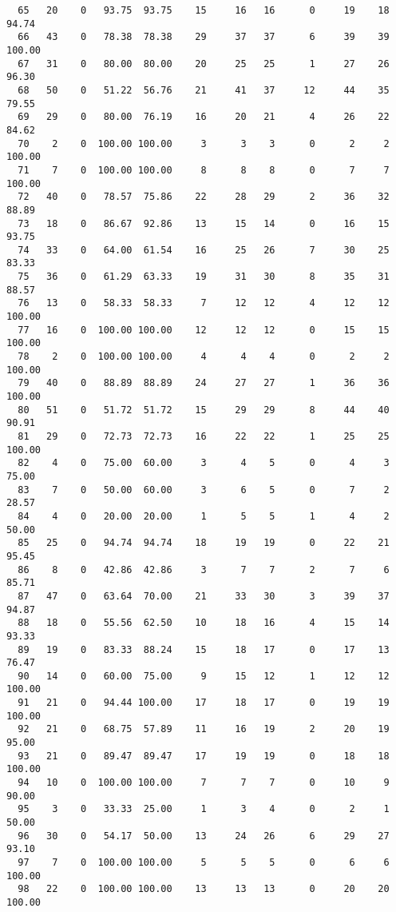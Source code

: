 \begin{verbatim}
  65   20    0   93.75  93.75    15     16   16      0     19    18    94.74
  66   43    0   78.38  78.38    29     37   37      6     39    39   100.00
  67   31    0   80.00  80.00    20     25   25      1     27    26    96.30
  68   50    0   51.22  56.76    21     41   37     12     44    35    79.55
  69   29    0   80.00  76.19    16     20   21      4     26    22    84.62
  70    2    0  100.00 100.00     3      3    3      0      2     2   100.00
  71    7    0  100.00 100.00     8      8    8      0      7     7   100.00
  72   40    0   78.57  75.86    22     28   29      2     36    32    88.89
  73   18    0   86.67  92.86    13     15   14      0     16    15    93.75
  74   33    0   64.00  61.54    16     25   26      7     30    25    83.33
  75   36    0   61.29  63.33    19     31   30      8     35    31    88.57
  76   13    0   58.33  58.33     7     12   12      4     12    12   100.00
  77   16    0  100.00 100.00    12     12   12      0     15    15   100.00
  78    2    0  100.00 100.00     4      4    4      0      2     2   100.00
  79   40    0   88.89  88.89    24     27   27      1     36    36   100.00
  80   51    0   51.72  51.72    15     29   29      8     44    40    90.91
  81   29    0   72.73  72.73    16     22   22      1     25    25   100.00
  82    4    0   75.00  60.00     3      4    5      0      4     3    75.00
  83    7    0   50.00  60.00     3      6    5      0      7     2    28.57
  84    4    0   20.00  20.00     1      5    5      1      4     2    50.00
  85   25    0   94.74  94.74    18     19   19      0     22    21    95.45
  86    8    0   42.86  42.86     3      7    7      2      7     6    85.71
  87   47    0   63.64  70.00    21     33   30      3     39    37    94.87
  88   18    0   55.56  62.50    10     18   16      4     15    14    93.33
  89   19    0   83.33  88.24    15     18   17      0     17    13    76.47
  90   14    0   60.00  75.00     9     15   12      1     12    12   100.00
  91   21    0   94.44 100.00    17     18   17      0     19    19   100.00
  92   21    0   68.75  57.89    11     16   19      2     20    19    95.00
  93   21    0   89.47  89.47    17     19   19      0     18    18   100.00
  94   10    0  100.00 100.00     7      7    7      0     10     9    90.00
  95    3    0   33.33  25.00     1      3    4      0      2     1    50.00
  96   30    0   54.17  50.00    13     24   26      6     29    27    93.10
  97    7    0  100.00 100.00     5      5    5      0      6     6   100.00
  98   22    0  100.00 100.00    13     13   13      0     20    20   100.00

\end{verbatim}
